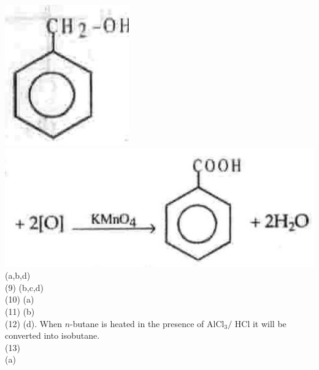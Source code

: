 \documentclass[10pt]{article}
\begin{document}
\includegraphics[max width=\textwidth, center]{2025_01_28_8470952b98110cec3aabg-245(1)}\\
\includegraphics[max width=\textwidth, center]{2025_01_28_8470952b98110cec3aabg-245(3)}\\
(a,b,d)\\
(9) (b,c,d)\\
(10) (a)\\
(11) (b)\\
(12) (d). When $n$-butane is heated in the presence of $\mathrm{AlCl}_{3} /$ HCl it will be converted into isobutane.\\
(13)\\
(a)\\
\end{document}
